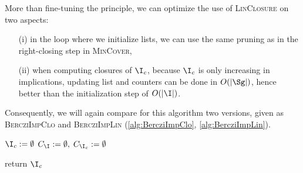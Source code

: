 \vspace{1.2em}

 More than fine-tuning the principle, we can optimize the use of \textsc{LinClosure} on two aspects:
\begin{itemize}
	\item[(i)] in the loop where we initialize lists, we can use the same
	pruning as in the right-closing step in \textsc{MinCover},
	\item[(ii)] when computing closures of $\I_c$, because $\I_c$ is only
	increasing in implications, updating list and counters can be done in $O(|\Sg|)$,	hence better than the initialization step of $O(|\I|)$.
\end{itemize}
\noindent Consequently, we will again compare for this algorithm two versions, given as \textsc{BercziImpClo} and \textsc{BercziImpLin} (\ref{alg:BercziImpClo}, \ref{alg:BercziImpLin}).

\vspace{1.2em}

\begin{algorithm}[H]
	
	\BlankLine
	\BlankLine
	
	$\I_c := \emptyset$ \;
	$C_{\I} := \emptyset, \; C_{\I_c} := \emptyset $ \;
	
	
	\BlankLine
	
	
	\BlankLine
	
	return $\I_c$ \;
	

	\label{alg:BercziImpClo}
\end{algorithm}

